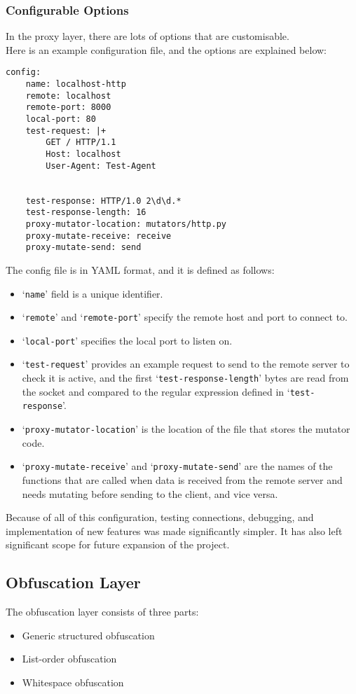 \subsubsection{Configurable Options}
In the proxy layer, there are lots of options that are customisable.\\
Here is an example configuration file, and the options are explained below:
\begin{verbatim}
config:
    name: localhost-http
    remote: localhost
    remote-port: 8000
    local-port: 80
    test-request: |+
        GET / HTTP/1.1
        Host: localhost
        User-Agent: Test-Agent


    test-response: HTTP/1.0 2\d\d.*
    test-response-length: 16
    proxy-mutator-location: mutators/http.py
    proxy-mutate-receive: receive
    proxy-mutate-send: send
\end{verbatim}
The config file is in YAML format, and it is defined as follows:
\begin{itemize}
\item `\texttt{name}' field is a unique identifier.
\item `\texttt{remote}' and `\texttt{remote-port}' specify the remote host and port to connect to.
\item `\texttt{local-port}' specifies the local port to listen on.
\item `\texttt{test-request}' provides an example request to send to the remote server to check it is active, and the first `\texttt{test-response-length}' bytes are read from the socket and compared to the regular expression defined in `\texttt{test-response}'.
\item `\texttt{proxy-mutator-location}' is the location of the file that stores the mutator code.
\item `\texttt{proxy-mutate-receive}' and `\texttt{proxy-mutate-send}' are the names of the functions that are called when data is received from the remote server and needs mutating before sending to the client, and vice versa.
\end{itemize}
Because of all of this configuration, testing connections, debugging, and implementation of new features was made significantly simpler. It has also left significant scope for future expansion of the project.

\subsection{Obfuscation Layer}
The obfuscation layer consists of three parts:
\begin{itemize}
    \item Generic structured obfuscation
    \item List-order obfuscation
    \item Whitespace obfuscation
\end{itemize}

